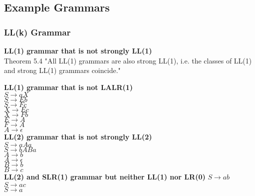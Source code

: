 \subsection{Example Grammars}
\begin{samepage}
\subsubsection{LL(k) Grammar}
\textbf{LL(1) grammar that is not strongly LL(1)}\\ %
    Theorem 5.4 "All LL(1) grammars are also strong LL(1), i.e. the classes of LL(1) and strong LL(1) grammars coincide."
    
\textbf{LL(1) grammar that is not LALR(1)}\\ %
    $S\rightarrow aX$\\
    $S\rightarrow Eb$\\
    $S\rightarrow F c$\\
    $X\rightarrow Ec$\\
    $X\rightarrow F b$\\
    $E\rightarrow A$\\
    $F\rightarrow A$\\
    $A\rightarrow \epsilon$\\

\textbf{LL(2) grammar that is not strongly LL(2)}\\ %
    $S \rightarrow aAa$\\
    $S \rightarrow bABa$\\
    $A \rightarrow b$\\
    $A \rightarrow \epsilon$\\
    $B \rightarrow b$\\
    $B \rightarrow c$\\
    
\textbf{LL(2) and SLR(1) grammar but neither LL(1) nor LR(0)} %
    $S\rightarrow ab$\\
    $S\rightarrow ac$\\
    $S\rightarrow a$\\
\end{samepage}
